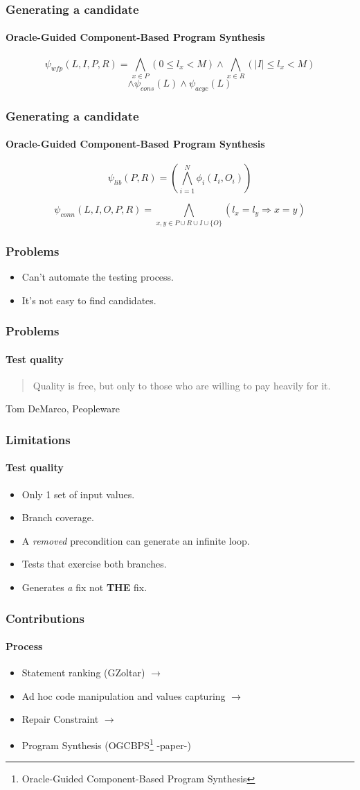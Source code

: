 \documentclass{beamer}
\begin{document}
\frame
{
  \frametitle{Generating a candidate}
  \framesubtitle{Oracle-Guided Component-Based Program Synthesis}
\begin{equation*}
\psi_{wfp}(L, I, P, R) = \bigwedge_{x \in P} (0 \leq l_x < M) \wedge \bigwedge_{x \in R} (|I| \leq l_x < M)
\end{equation*}
\begin{equation*}
\wedge \psi_{cons}(L) \wedge \psi_{acyc}(L)
\end{equation*}
}

\frame
{
  \frametitle{Generating a candidate}
  \framesubtitle{Oracle-Guided Component-Based Program Synthesis}
\begin{equation*}
\psi_{lib}(P, R) = \left( \bigwedge^N_{i=1} \phi_i(I_i, O_i) \right)
\end{equation*}

\begin{equation*}
\psi_{conn}(L, I, O, P, R) = \bigwedge_{x, y \in P \cup R \cup I \cup \{O\}} (l_x = l_y \Rightarrow x = y)
\end{equation*}
}

  \frame
  {
    \frametitle{Problems}
\begin{itemize}
\item Can't automate the testing process.
\item It's not easy to find candidates.
\end{itemize}    
  }

  \frame
  {
    \frametitle{Problems}
    \framesubtitle{Test quality}
   \begin{quote}
    Quality is free, but only to those who are willing to pay heavily for it.
   \end{quote}
    Tom DeMarco, Peopleware   
  }
  
  \frame
  {
    \frametitle{Limitations}
    \framesubtitle{Test quality}
\begin{itemize}
\item Only 1 set of input values.
\item Branch coverage.
\item A \textit{removed} precondition can generate an infinite loop.
\item Tests that exercise both branches.
\item Generates \textit{a} fix not \textbf{THE} fix.
\end{itemize}        
  }

  \frame
  {  
    \frametitle{Contributions}
      \framesubtitle{Process}
\begin{itemize}
\item Statement ranking (GZoltar)  $\rightarrow$
\item Ad hoc code manipulation and values capturing $\rightarrow$
\item Repair Constraint  $\rightarrow$
\item Program Synthesis (OGCBPS\footnote{Oracle-Guided Component-Based Program Synthesis} -paper-)
\end{itemize}
}
\end{document}
